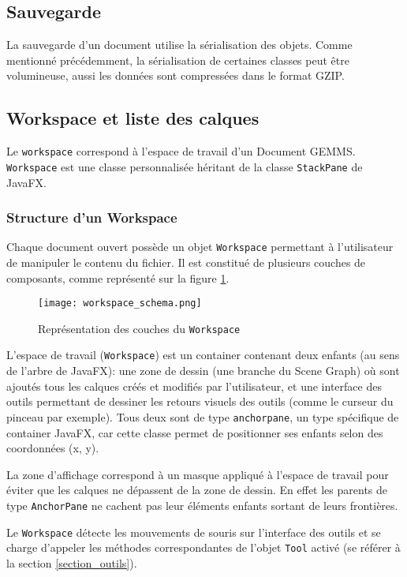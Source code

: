 \subsection{Sauvegarde}
La sauvegarde d'un document utilise la sérialisation des objets. Comme mentionné précédemment, la sérialisation de certaines classes peut être volumineuse, aussi les données sont compressées dans le format GZIP.

\subsection{Workspace et liste des calques}
Le \texttt{\gls{workspace}} correspond à l'espace de travail d'un Document GEMMS. \texttt{Workspace} est une classe personnalisée héritant de la classe \texttt{StackPane} de JavaFX. 

\subsubsection{Structure d'un Workspace}
\label{sec:structure_workspace}
Chaque document ouvert possède un objet \texttt{Workspace} permettant à l'utilisateur de manipuler le contenu du fichier. Il est constitué de plusieurs couches de composants, comme représenté sur la figure \ref{fig:workspace_representation}.


\begin{figure}[!ht]
	\caption{Représentation des couches du \texttt{Workspace}}
	\centering
	\texttt{[image: workspace\_schema.png]}
	\label{fig:workspace_representation}
\end{figure}

L'espace de travail (\texttt{Workspace}) est un container contenant deux enfants (au sens de l'arbre de JavaFX): une zone de dessin (une branche du Scene Graph) où sont ajoutés tous les calques créés et modifiés par l'utilisateur, et une interface des outils permettant de dessiner les retours visuels des outils (comme le curseur du pinceau par exemple). Tous deux sont de type \texttt{\gls{anchorpane}}, un type spécifique de container JavaFX, car cette classe permet de positionner ses enfants selon des coordonnées (x, y).

La zone d'affichage correspond à un masque appliqué à l'espace de travail pour éviter que les calques ne dépassent de la zone de dessin. En effet les parents de type \texttt{AnchorPane} ne cachent pas leur éléments enfants sortant de leurs frontières.

Le \texttt{Workspace} détecte les mouvements de souris sur l'interface des outils et se charge d'appeler les méthodes correspondantes de l'objet \texttt{Tool} activé (se référer à la section \ref{section_outils}).

